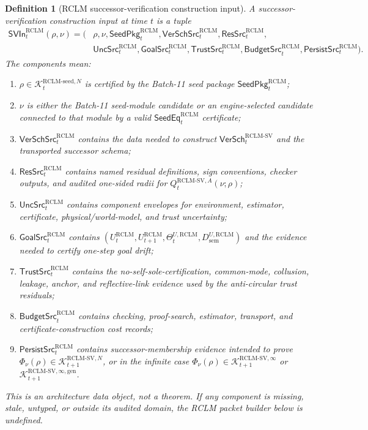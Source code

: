 \documentclass[11pt,a4paper]{article}
\newtheorem{definition}[theorem]{Definition}
\newcommand{\Kcal}{\mathcal K}
\newcommand{\RCLM}{\mathrm{RCLM}}
\newcommand{\sem}{\mathrm{sem}}
\begin{document}
\begin{definition}[RCLM successor-verification construction input]
\label{def:rclm-batch12b-sv-construction-input}
A successor-verification construction input at time \(t\) is a tuple
\[
\begin{aligned}
\mathsf{SVIn}_t^{\RCLM}(\rho,\nu)
=(&\rho,\nu,
\mathsf{SeedPkg}_t^{\RCLM},
\mathsf{VerSchSrc}_t^{\RCLM},
\mathsf{ResSrc}_t^{\RCLM},\\
&\mathsf{UncSrc}_t^{\RCLM},
\mathsf{GoalSrc}_t^{\RCLM},
\mathsf{TrustSrc}_t^{\RCLM},
\mathsf{BudgetSrc}_t^{\RCLM},
\mathsf{PersistSrc}_t^{\RCLM}).
\end{aligned}
\]
The components mean:
\begin{enumerate}[label=(\roman*),leftmargin=1.5em]
    \item \(\rho\in\Kcal_t^{\RCLM\text{-}\mathrm{seed},N}\) is certified by the Batch-11 seed package \(\mathsf{SeedPkg}_t^{\RCLM}\);
    \item \(\nu\) is either the Batch-11 seed-module candidate or an engine-selected candidate connected to that module by a valid \(\mathsf{SeedEq}_t^{\RCLM}\) certificate;
    \item \(\mathsf{VerSchSrc}_t^{\RCLM}\) contains the data needed to construct \(\mathsf{VerSch}_t^{\RCLM\text{-}\mathrm{SV}}\) and the transported successor schema;
    \item \(\mathsf{ResSrc}_t^{\RCLM}\) contains named residual definitions, sign conventions, checker outputs, and audited one-sided radii for \(Q_t^{\RCLM\text{-}\mathrm{SV},A}(\nu;\rho)\);
    \item \(\mathsf{UncSrc}_t^{\RCLM}\) contains component envelopes for environment, estimator, certificate, physical/world-model, and trust uncertainty;
    \item \(\mathsf{GoalSrc}_t^{\RCLM}\) contains \((U_t^{\RCLM},U_{t+1}^{\RCLM},\Theta_t^{U,\RCLM},D_{\sem}^{U,\RCLM})\) and the evidence needed to certify one-step goal drift;
    \item \(\mathsf{TrustSrc}_t^{\RCLM}\) contains the no-self-sole-certification, common-mode, collusion, leakage, anchor, and reflective-link evidence used by the anti-circular trust residuals;
    \item \(\mathsf{BudgetSrc}_t^{\RCLM}\) contains checking, proof-search, estimator, transport, and certificate-construction cost records;
    \item \(\mathsf{PersistSrc}_t^{\RCLM}\) contains successor-membership evidence intended to prove \(\Phi_\nu(\rho)\in\Kcal_{t+1}^{\RCLM\text{-}\mathrm{SV},N}\), or in the infinite case \(\Phi_\nu(\rho)\in\Kcal_{t+1}^{\RCLM\text{-}\mathrm{SV},\infty}\) or \(\Kcal_{t+1}^{\RCLM\text{-}\mathrm{SV},\infty,\mathrm{gen}}\).
\end{enumerate}
This is an architecture data object, not a theorem.  If any component is missing, stale, untyped, or outside its audited domain, the RCLM packet builder below is undefined.
\end{definition}
\end{document}
